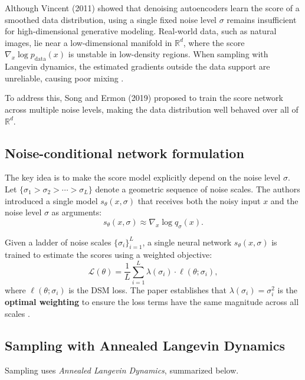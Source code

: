 \documentclass[11pt,a4paper]{article}
\begin{document}
Although Vincent (2011) showed that denoising autoencoders learn the score of a smoothed data distribution, using a single fixed noise level $\sigma$ remains insufficient for high-dimensional generative modeling. Real-world data, such as natural images, lie near a low-dimensional manifold in $\mathbb{R}^d$, where the score $\nabla_x \log p_{\text{data}}(x)$ is unstable in low-density regions. When sampling with Langevin dynamics, the estimated gradients outside the data support are unreliable, causing poor mixing \cite{song2019}.

To address this, Song and Ermon (2019) proposed to train the score network across multiple noise levels, making the data distribution well behaved over all of $\mathbb{R}^d$.

\subsection{Noise-conditional network formulation}

The key idea is to make the score model explicitly depend on the noise level $\sigma$. Let $\{\sigma_1 > \sigma_2 > \cdots > \sigma_L\}$ denote a geometric sequence of noise scales. The authors introduced a single model $s_\theta(x,\sigma)$ that receives both the noisy input $x$ and the noise level $\sigma$ as arguments:
\[
s_\theta(x,\sigma) \approx \nabla_x \log q_\sigma(x).
\]

\begin{tcolorbox}[colback=gray!5!white,colframe=black, title={Noise-Conditional Score Network (NCSN)}]
Given a ladder of noise scales $\{\sigma_i\}_{i=1}^{L}$, a single neural network $s_\theta(x,\sigma)$ is trained to estimate the scores using a weighted objective:
\begin{equation}
\mathcal L(\theta) =\frac{1}{L}\sum_{i=1}^{L} \lambda(\sigma_i) \cdot \ell(\theta;\sigma_i),
\label{eq:dsm-multi}
\end{equation}
where $\ell(\theta;\sigma_i)$ is the DSM loss. The paper establishes that $\lambda(\sigma_i) = \sigma_i^2$ is the \textbf{optimal weighting} to ensure the loss terms have the same magnitude across all scales \cite{song2019}.
\end{tcolorbox}

\subsection{Sampling with Annealed Langevin Dynamics}

Sampling uses \emph{Annealed Langevin Dynamics}, summarized below.
\end{document}
